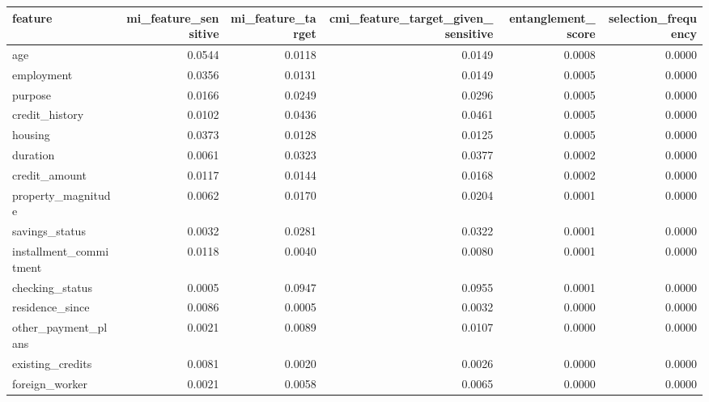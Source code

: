 \begin{tabular}{lrrrrr}
\toprule
feature & mi\_feature\_sensitive & mi\_feature\_target & cmi\_feature\_target\_given\_sensitive & entanglement\_score & selection\_frequency \\
\midrule
age & 0.0544 & 0.0118 & 0.0149 & 0.0008 & 0.0000 \\
employment & 0.0356 & 0.0131 & 0.0149 & 0.0005 & 0.0000 \\
purpose & 0.0166 & 0.0249 & 0.0296 & 0.0005 & 0.0000 \\
credit\_history & 0.0102 & 0.0436 & 0.0461 & 0.0005 & 0.0000 \\
housing & 0.0373 & 0.0128 & 0.0125 & 0.0005 & 0.0000 \\
duration & 0.0061 & 0.0323 & 0.0377 & 0.0002 & 0.0000 \\
credit\_amount & 0.0117 & 0.0144 & 0.0168 & 0.0002 & 0.0000 \\
property\_magnitude & 0.0062 & 0.0170 & 0.0204 & 0.0001 & 0.0000 \\
savings\_status & 0.0032 & 0.0281 & 0.0322 & 0.0001 & 0.0000 \\
installment\_commitment & 0.0118 & 0.0040 & 0.0080 & 0.0001 & 0.0000 \\
checking\_status & 0.0005 & 0.0947 & 0.0955 & 0.0001 & 0.0000 \\
residence\_since & 0.0086 & 0.0005 & 0.0032 & 0.0000 & 0.0000 \\
other\_payment\_plans & 0.0021 & 0.0089 & 0.0107 & 0.0000 & 0.0000 \\
existing\_credits & 0.0081 & 0.0020 & 0.0026 & 0.0000 & 0.0000 \\
foreign\_worker & 0.0021 & 0.0058 & 0.0065 & 0.0000 & 0.0000 \\
\bottomrule
\end{tabular}
